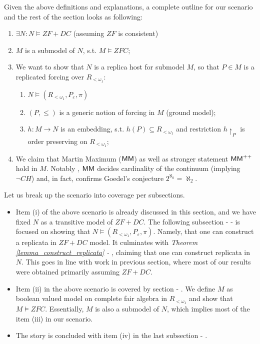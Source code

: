Given the above definitions and explanations, a complete outline for our scenario and the rest of the section looks as following:
\begin{enumerate}[label=(\roman*)]
    \item $\exists N: N \models ZF + DC$ (assuming $ZF$ is consistent)
    \item $M$ is a submodel of $N$, s.t. $M \models ZFC$;
    \item We want to show that $N$ is a replica host for submodel $M$, so that $P \in M$ is a replicated forcing over $R_{<\omega_1}$: 
    \begin{enumerate}
        \item $N \models (R_{<\omega_1}, P_\varepsilon, \pi)$
        \item $(P, \leq)$ is a generic notion of forcing in $M$ (ground model);
        \item $h: M \to N$ is an embedding, s.t. $h(P) \subseteq R_{<\omega_1}$ and restriction $h{\upharpoonright}_P$ is order preserving on $R_{<\omega_1}$;
    \end{enumerate}
    \item We claim that Martin Maximum (${\sf MM}$) as well as stronger statement ${\sf MM}^{++}$ hold in $M$. Notably \cite{aspero2021sf}, ${\sf MM}$ decides cardinality of the continuum (implying $\neg CH$) and, in fact, confirms Goedel's conjecture $2^{\aleph_0} = \aleph_2$.
\end{enumerate}

Let us break up the scenario into coverage per subsections.
\begin{itemize}
    \item Item (i) of the above scenario is already discussed in this section, and we have fixed $N$ as a transitive model of $ZF + DC$. The following subsection - \textit{} - is focused on showing that $N \models (R_{<\omega_1}, P_\varepsilon, \pi)$. Namely, that one can construct a replicata in $ZF + DC$ model. It culminates with \textit{Theorem \ref{lemma_construct_replicata} - }, claiming that one can construct replicata in $N$. This goes in line with work in previous section, where most of our results were obtained primarily assuming $ZF+DC$. 
    \item Item (ii) in the above scenario is covered by section - \textit{}. We define $M$ as boolean valued model on complete fair algebra in $R_{<\omega_1}$ and show that $M \models ZFC$. Essentially, $M$ is also a submodel of $N$, which implies most of the item (iii) in our scenario.
    \item The story is concluded with item (iv) in the last subsection - \textit{}.
\end{itemize}





